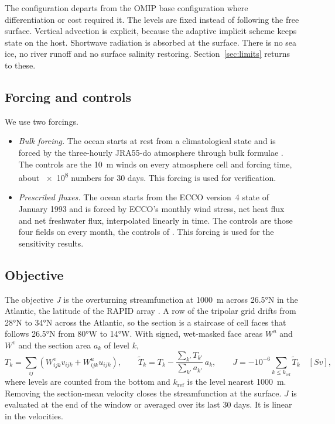 \documentclass[11pt]{article}
\begin{document}
The configuration departs from the OMIP base configuration where differentiation or cost required it. The levels
are fixed instead of following the free surface. Vertical advection is explicit, because the adaptive implicit
scheme keeps state on the host. Shortwave radiation is absorbed at the surface. There is no sea ice, no river
runoff and no surface salinity restoring. Section~\ref{sec:limits} returns to these.

\subsection{Forcing and controls}

We use two forcings.
\begin{itemize}
  \item \emph{Bulk forcing.} The ocean starts at rest from a climatological state and is forced by the
        three-hourly JRA55-do atmosphere \citep{tsujino2018} through bulk formulae \citep{large2009}. The controls
        are the \SI{10}{m} winds on every atmosphere cell and forcing time, about \num{e8} numbers for 30 days.
        This forcing is used for verification.
  \item \emph{Prescribed fluxes.} The ocean starts from the ECCO version~4 state \citep{forget2015} of January
        1993 and is forced by ECCO's monthly wind stress, net heat flux and net freshwater flux, interpolated
        linearly in time. The controls are those four fields on every month, the controls of \citet{pillar2016}.
        This forcing is used for the sensitivity results.
\end{itemize}

\subsection{Objective}

The objective $J$ is the overturning streamfunction at \SI{1000}{m} across \ang{26.5}N in the Atlantic, the latitude
of the RAPID array \citep{mccarthy2015}. A row of the tripolar grid drifts from \ang{28}N to \ang{34}N across the
Atlantic, so the section is a staircase of cell faces that follows \ang{26.5}N from \ang{80}W to \ang{14}W. With
signed, wet-masked face areas $W^u$ and $W^v$ and the section area $a_k$ of level $k$,
\begin{equation}
T_k = \sum_{ij} \left(W^{v}_{ijk} v_{ijk} + W^{u}_{ijk} u_{ijk}\right), \qquad
\tilde T_k = T_k - \frac{\sum_{k'} T_{k'}}{\sum_{k'} a_{k'}}\, a_k, \qquad
J = -10^{-6} \sum_{k \le k_{\text{ref}}} \tilde T_k \quad [\si{Sv}],
\label{eq:objective}
\end{equation}
where levels are counted from the bottom and $k_{\text{ref}}$ is the level nearest \SI{1000}{m}. Removing the
section-mean velocity closes the streamfunction at the surface. $J$ is evaluated at the end of the window or
averaged over its last 30 days. It is linear in the velocities.
\end{document}
